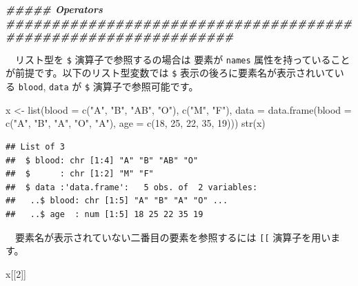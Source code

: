 \documentclass[
  12pt,
]{book}
\newenvironment{Shaded}{\begin{snugshade}}{\end{snugshade}}
\newcommand{\AttributeTok}[1]{\textcolor[rgb]{0.77,0.63,0.00}{#1}}
\newcommand{\DecValTok}[1]{\textcolor[rgb]{0.00,0.00,0.81}{#1}}
\newcommand{\DocumentationTok}[1]{\textcolor[rgb]{0.56,0.35,0.01}{\textbf{\textit{#1}}}}
\newcommand{\FunctionTok}[1]{\textcolor[rgb]{0.00,0.00,0.00}{#1}}
\newcommand{\NormalTok}[1]{#1}
\newcommand{\OtherTok}[1]{\textcolor[rgb]{0.56,0.35,0.01}{#1}}
\newcommand{\StringTok}[1]{\textcolor[rgb]{0.31,0.60,0.02}{#1}}
\begin{document}
\begin{Shaded}
\begin{Highlighting}[numbers=left,,]
\DocumentationTok{\#\#\#\#\# Operators \#\#\#\#\#\#\#\#\#\#\#\#\#\#\#\#\#\#\#\#\#\#\#\#\#\#\#\#\#\#\#\#\#\#\#\#\#\#\#\#\#\#\#\#\#\#\#\#\#\#\#\#\#\#\#\#\#\#\#\#\#\#\#}
\end{Highlighting}
\end{Shaded}

　リスト型を \texttt{\$} 演算子で参照するの場合は 要素が \texttt{names} 属性を持っていることが前提です。以下のリスト型変数では \texttt{\$} 表示の後ろに要素名が表示されいている \texttt{blood}, \texttt{data} が \texttt{\$} 演算子で参照可能です。

\begin{Shaded}
\begin{Highlighting}[numbers=left,,]
\NormalTok{x }\OtherTok{\textless{}{-}} \FunctionTok{list}\NormalTok{(}\AttributeTok{blood =} \FunctionTok{c}\NormalTok{(}\StringTok{"A"}\NormalTok{, }\StringTok{"B"}\NormalTok{, }\StringTok{"AB"}\NormalTok{, }\StringTok{"O"}\NormalTok{), }\FunctionTok{c}\NormalTok{(}\StringTok{"M"}\NormalTok{, }\StringTok{"F"}\NormalTok{),}
          \AttributeTok{data =} \FunctionTok{data.frame}\NormalTok{(}\AttributeTok{blood =} \FunctionTok{c}\NormalTok{(}\StringTok{"A"}\NormalTok{, }\StringTok{"B"}\NormalTok{, }\StringTok{"A"}\NormalTok{, }\StringTok{"O"}\NormalTok{, }\StringTok{"A"}\NormalTok{),}
                            \AttributeTok{age =} \FunctionTok{c}\NormalTok{(}\DecValTok{18}\NormalTok{, }\DecValTok{25}\NormalTok{, }\DecValTok{22}\NormalTok{, }\DecValTok{35}\NormalTok{, }\DecValTok{19}\NormalTok{)))}
\FunctionTok{str}\NormalTok{(x)}
\end{Highlighting}
\end{Shaded}

\begin{verbatim}
## List of 3
##  $ blood: chr [1:4] "A" "B" "AB" "O"
##  $      : chr [1:2] "M" "F"
##  $ data :'data.frame':   5 obs. of  2 variables:
##   ..$ blood: chr [1:5] "A" "B" "A" "O" ...
##   ..$ age  : num [1:5] 18 25 22 35 19
\end{verbatim}

　要素名が表示されていない二番目の要素を参照するには \texttt{{[}{[}} 演算子を用います。

\begin{Shaded}
\begin{Highlighting}[numbers=left,,]
\NormalTok{x[[}\DecValTok{2}\NormalTok{]]}
\end{Highlighting}
\end{Shaded}
\end{document}

